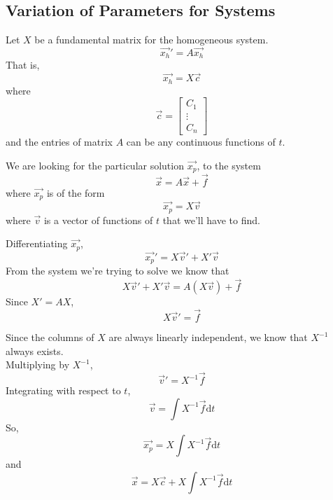 \subsection{Variation of Parameters for Systems}
\noindent
Let $X$ be a fundamental matrix for the homogeneous system.
\begin{equation*}
	\vec{x_h}' = A\vec{x_h}
\end{equation*}
That is,
\begin{equation*}
	\vec{x_h} = X\vec{c}
\end{equation*}
where
\begin{equation*}
	\vec{c} = \begin{bmatrix}
	C_1 \\
	\vdots \\
	C_n
	\end{bmatrix}
\end{equation*}
and the entries of matrix $A$ can be any continuous functions of $t$.

\noindent
We are looking for the particular solution $\vec{x_p}$, to the system
\begin{equation*}
	\vec{x} = A\vec{x} + \vec{f}
\end{equation*}
where $\vec{x_p}$ is of the form
\begin{equation*}
	\vec{x_p} = X\vec{v}
\end{equation*}
where $\vec{v}$ is a vector of functions of $t$ that we'll have to find.

\noindent
Differentiating $\vec{x_p}$,
\begin{equation*}
	\vec{x_p}' = X\vec{v}' + X'\vec{v}
\end{equation*}
From the system we're trying to solve we know that
\begin{equation*}
	X\vec{v}' + X'\vec{v} = A(X\vec{v}) + \vec{f}
\end{equation*}
Since $X' = AX$,
\begin{equation*}
	X\vec{v}' = \vec{f}
\end{equation*}

\noindent
Since the columns of $X$ are always linearly independent, we know that $X^{-1}$ always exists.\\
Multiplying by $X^{-1}$,
\begin{equation*}
	\vec{v}' = X^{-1}\vec{f}
\end{equation*}
Integrating with respect to $t$,
\begin{equation*}
	\vec{v} = \int{X^{-1}\vec{f} \mathrm{d}t}
\end{equation*}
So,
\begin{equation*}
	\vec{x_p} = X\int{X^{-1}\vec{f} \mathrm{d}t}
\end{equation*}
and
\begin{equation*}
	\vec{x} = X\vec{c} + X\int{X^{-1}\vec{f} \mathrm{d}t}
\end{equation*}

